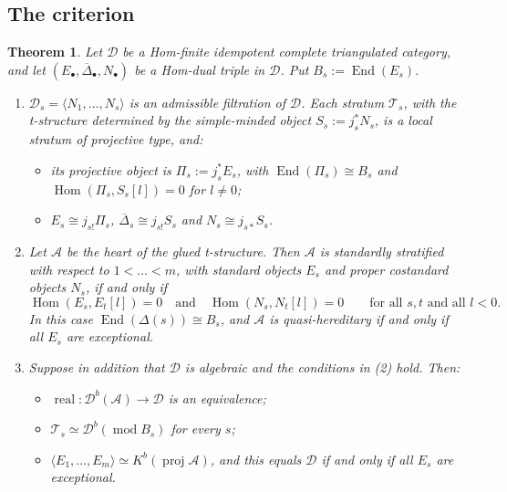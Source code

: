 \documentclass[11pt,reqno]{amsart}
\theoremstyle{plain}
\newtheorem{theorem}{Theorem}[section]
\theoremstyle{definition}
\theoremstyle{remark}
\DeclareMathOperator{\Hom}{Hom}
\DeclareMathOperator{\End}{End}
\DeclareMathOperator{\real}{real}
\newcommand{\modd}{\operatorname{mod}}
\newcommand{\proj}{\operatorname{proj}}
\newcommand{\Db}{\mathcal{D}^b}
\newcommand{\Kb}{K^b}
\newcommand{\thick}[1]{\langle #1\rangle}
\newcommand{\Deltabar}{\overline{\Delta}}
\newcommand{\cD}{\mathcal{D}}
\newcommand{\cA}{\mathcal{A}}
\newcommand{\cT}{\mathcal{T}}
\begin{document}
\subsection{The criterion}

\begin{theorem}\label{thm:B}
Let $\cD$ be a Hom-finite idempotent complete triangulated category, and let $(E_\bullet,\Deltabar_\bullet,N_\bullet)$ be a Hom-dual triple in $\cD$. Put $B_s:=\End(E_s)$.
\begin{enumerate}
\item $\cD_s=\thick{N_1,\dots,N_s}$ is an admissible filtration of $\cD$. Each stratum $\cT_s$, with the t-structure determined by the simple-minded object $S_s:=j_s^*N_s$, is a local stratum of projective type, and:
\begin{itemize}
\item its projective object is $\Pi_s:=j_s^*E_s$, with $\End(\Pi_s)\cong B_s$ and $\Hom(\Pi_s,S_s[l])=0$ for $l\ne0$;
\item $E_s\cong j_{s!}\Pi_s$, $\Deltabar_s\cong j_{s!}S_s$ and $N_s\cong j_{s*}S_s$.
\end{itemize}
\item Let $\cA$ be the heart of the glued t-structure. Then $\cA$ is standardly stratified with respect to $1<\dots<m$, with standard objects $E_s$ and proper costandard objects $N_s$, if and only if
\[\Hom(E_s,E_t[l])=0\quad\text{and}\quad\Hom(N_s,N_t[l])=0\qquad\text{for all $s,t$ and all $l<0$.}\]
In this case $\End(\Delta(s))\cong B_s$, and $\cA$ is quasi-hereditary if and only if all $E_s$ are exceptional.
\item Suppose in addition that $\cD$ is algebraic and the conditions in \textup{(2)} hold. Then:
\begin{itemize}
\item $\real\colon\Db(\cA)\to\cD$ is an equivalence;
\item $\cT_s\simeq\Db(\modd B_s)$ for every $s$;
\item $\thick{E_1,\dots,E_m}\simeq\Kb(\proj\cA)$, and this equals $\cD$ if and only if all $E_s$ are exceptional.
\end{itemize}
\end{enumerate}
\end{theorem}
\end{document}

